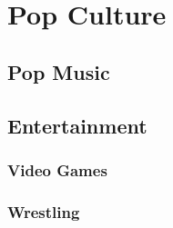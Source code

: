 \chapter{Pop Culture}
	\section{Pop Music}
	\section{Entertainment}
		\subsection{Video Games}
		\subsection{Wrestling}